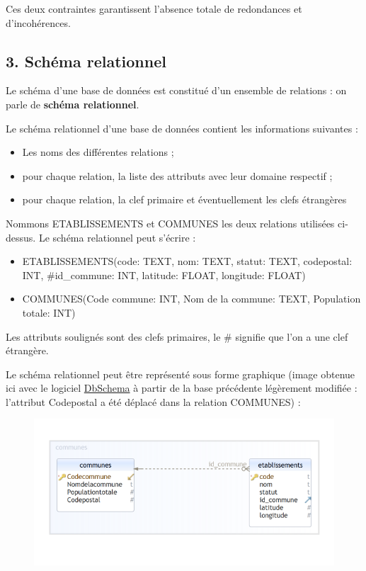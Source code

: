 \documentclass[
  a4paper,
  DIV=11,
  numbers=noendperiod]{scrartcl}
\providecommand{\tightlist}{%
  \setlength{\itemsep}{0pt}\setlength{\parskip}{0pt}}\usepackage{longtable,booktabs,array}
\begin{document}
Ces deux contraintes garantissent l'absence totale de redondances et
d'incohérences.

\newpage{}

\hypertarget{schuxe9ma-relationnel}{%
\subsection{3. Schéma relationnel}\label{schuxe9ma-relationnel}}

Le schéma d'une base de données est constitué d'un ensemble de relations
: on parle de \textbf{schéma relationnel}.

Le schéma relationnel d'une base de données contient les informations
suivantes :

\begin{itemize}
\tightlist
\item
  Les noms des différentes relations ;
\item
  pour chaque relation, la liste des attributs avec leur domaine
  respectif ;
\item
  pour chaque relation, la clef primaire et éventuellement les clefs
  étrangères
\end{itemize}

Nommons ETABLISSEMENTS et COMMUNES les deux relations utilisées
ci-dessus. Le schéma relationnel peut s'écrire :

\begin{itemize}
\tightlist
\item
  ETABLISSEMENTS({code}: TEXT, nom: TEXT, statut: TEXT, codepostal: INT,
  \#id\_commune: INT, latitude: FLOAT, longitude: FLOAT)
\item
  COMMUNES({Code commune}: INT, Nom de la commune: TEXT, Population
  totale: INT)
\end{itemize}

Les attributs soulignés sont des clefs primaires, le \# signifie que
l'on a une clef étrangère.

Le schéma relationnel peut être représenté sous forme graphique (image
obtenue ici avec le logiciel
\href{https://dbschema.com/download.html}{DbSchema} à partir de la base
précédente légèrement modifiée : l'attribut Codepostal a été déplacé
dans la relation COMMUNES) :

\begin{figure}

{\centering \includegraphics{BDD11.png}

}

\end{figure}
\end{document}
